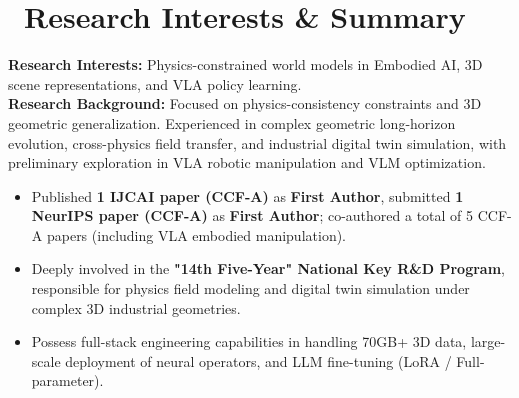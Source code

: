 \documentclass[11pt]{article}
\begin{document}
\section{\makebox[\widthof{\faBookmark}][c]{\color{CVBlue}\faBookmark}\ Research Interests \& Summary} 
\textbf{Research Interests:} Physics-constrained world models in Embodied AI, 3D scene representations, and VLA policy learning.\\
\textbf{Research Background:} Focused on physics-consistency constraints and 3D geometric generalization. Experienced in complex geometric long-horizon evolution, cross-physics field transfer, and industrial digital twin simulation, with preliminary exploration in VLA robotic manipulation and VLM optimization.
\begin{itemize}[leftmargin=1.5em]
    \item Published \textbf{1 IJCAI paper (CCF-A)} as \textbf{First Author}, submitted \textbf{1 NeurIPS paper (CCF-A)} as \textbf{First Author}; co-authored a total of 5 CCF-A papers (including VLA embodied manipulation).
    \item Deeply involved in the \textbf{"14th Five-Year" National Key R\&D Program}, responsible for physics field modeling and digital twin simulation under complex 3D industrial geometries.
    \item Possess full-stack engineering capabilities in handling 70GB+ 3D data, large-scale deployment of neural operators, and LLM fine-tuning (LoRA / Full-parameter).
\end{itemize}


\end{document}
